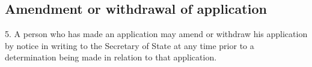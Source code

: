 \documentclass[12pt,a4paper]{article}
\begin{document}
%
%
%
%
%


\subsection[5. Amendment or withdrawal of application]{Amendment or withdrawal of application}

5. A person who has made an application
may amend or withdraw his application by notice in writing to the Secretary of
State at any time prior to a determination being made in relation to that
application.
\end{document}
